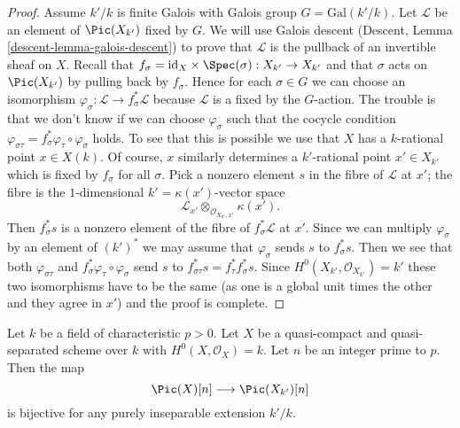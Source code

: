 \begin{proof}
\medskip\noindent
Assume $k'/k$ is finite Galois with Galois group $G = \text{Gal}(k'/k)$.
Let $\mathcal{L}$ be an element of $\Pic(X_{k'})$ fixed by $G$.
We will use Galois descent (Descent, Lemma \ref{descent-lemma-galois-descent})
to prove that $\mathcal{L}$ is the pullback of an invertible sheaf on $X$.
Recall that $f_\sigma = \text{id}_X \times \Spec(\sigma) : X_{k'} \to X_{k'}$
and that $\sigma$ acts on $\Pic(X_{k'})$ by pulling back by $f_\sigma$.
Hence for each $\sigma \in G$ we can choose an isomorphism
$\varphi_\sigma : \mathcal{L} \to f_\sigma^*\mathcal{L}$
because $\mathcal{L}$ is a fixed by the $G$-action.
The trouble is that we don't know if we can choose
$\varphi_\sigma$ such that the cocycle condition
$\varphi_{\sigma\tau} = f_\sigma^*\varphi_\tau \circ \varphi_\sigma$
holds. To see that this is possible we use that $X$ has a $k$-rational point
$x \in X(k)$. Of course, $x$ similarly determines a $k'$-rational point
$x' \in X_{k'}$ which is fixed by $f_\sigma$ for all $\sigma$.
Pick a nonzero element $s$ in the fibre of $\mathcal{L}$ at $x'$;
the fibre is the $1$-dimensional $k' = \kappa(x')$-vector space
$$
\mathcal{L}_{x'} \otimes_{\mathcal{O}_{X_{k'}, x'}} \kappa(x').
$$
Then $f_\sigma^*s$ is a nonzero element of the fibre of
$f_\sigma^*\mathcal{L}$ at $x'$. Since we can multiply $\varphi_\sigma$
by an element of $(k')^*$ we may assume that $\varphi_\sigma$ sends
$s$ to $f_\sigma^*s$. Then we see that both $\varphi_{\sigma\tau}$ and
$f_\sigma^*\varphi_\tau \circ \varphi_\sigma$
send $s$ to $f_{\sigma\tau}^*s = f_\tau^*f_\sigma^*s$.
Since $H^0(X_{k'}, \mathcal{O}_{X_{k'}}) = k'$ these two isomorphisms
have to be the same (as one is a global unit times the other
and they agree in $x'$) and the proof is complete.
\end{proof}

\begin{lemma}
\label{lemma-torsion-descends}
Let $k$ be a field of characteristic $p > 0$. Let $X$ be a
quasi-compact and quasi-separated scheme over $k$ with
$H^0(X, \mathcal{O}_X) = k$. Let $n$ be an integer prime to $p$.
Then the map
$$
\Pic(X)[n] \longrightarrow \Pic(X_{k'})[n]
$$
is bijective for any purely inseparable extension $k'/k$.
\end{lemma}

